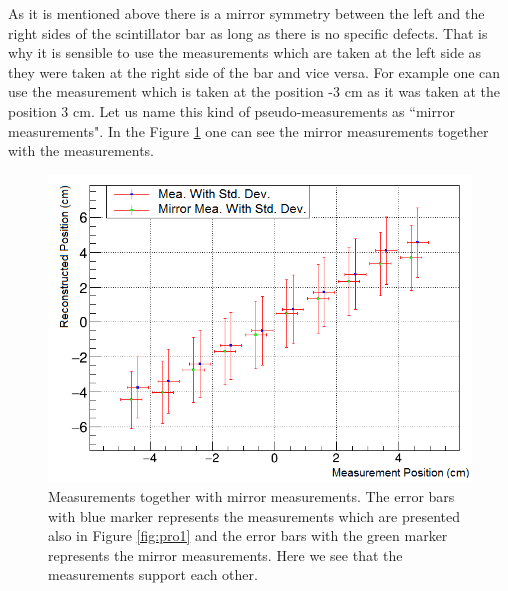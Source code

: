 \documentclass[a4paper]{article}\linespread{1.4}
\begin{document}
As it is mentioned above there is a mirror symmetry between the left and the right sides of the scintillator bar as long as there is no specific defects. 
That is why it is sensible to use the measurements which are taken at the left side as they were taken at the right side of the bar and vice versa. For example one can use the measurement which is taken at the position -3 cm as it was taken at the position 3 cm. Let us name this kind of pseudo-measurements as ``mirror measurements".
In the Figure \ref{fig:pro5} one can see the mirror measurements together with the measurements.\begin{figure}[h!] \hspace*{-0cm} \includegraphics[width=120mm,scale=2.0]{figures/pro5.png} \caption{Measurements together with mirror measurements. The error bars with blue marker represents the measurements which are presented also in Figure \ref{fig:pro1} and the error bars with the green marker represents the mirror measurements. Here we see that the measurements support each other.} \label{fig:pro5}\end{figure}
\end{document}
